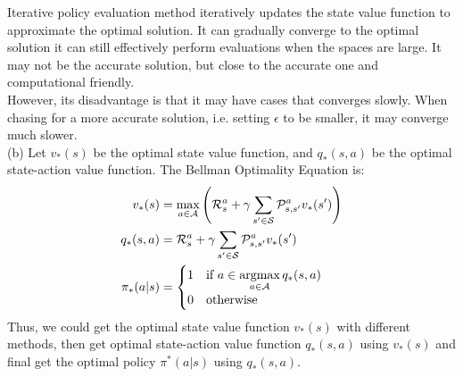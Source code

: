 \begin{homeworkProblem}
Iterative policy evaluation method iteratively updates the state value function to approximate the optimal solution. It can gradually converge to the optimal solution it can still effectively perform evaluations when the spaces are large. It may not be the accurate solution, but close to the accurate one and computational friendly. \\
However, its disadvantage is that it may have cases that converges slowly. When chasing for a more accurate solution, i.e. setting $\epsilon$ to be smaller, it may converge much slower. \\

(b) Let $v_*(s)$ be the optimal state value function, and $q_*(s,a)$ be the optimal state-action value function. The Bellman Optimality Equation is:
\begin{align*}
v_*(s) &= \max_{a \in \mathcal{A}}\left(\mathcal{R}_s^a + \gamma \sum_{s' \in \mathcal{S}} \mathcal{P}_{s,s'}^a v_*(s')\right) \\
q_*(s,a) &= \mathcal{R}_s^a + \gamma \sum_{s' \in \mathcal{S}} \mathcal{P}_{s,s'}^a v_*(s') \\
\pi_*(a|s) &= \begin{cases}
1 & \text{if } a\in \mathop{\rm argmax}\limits_{a\in\mathcal{A}}q_*(s,a) \\
0 & \text{otherwise}
\end{cases}
\end{align*}
Thus, we could get the optimal state value function $v_*(s)$ with different methods, then get optimal state-action value function $q_*(s,a)$ using $v_*(s)$ and final get the optimal policy $\pi^*(a|s)$ using $q_*(s,a)$.


\end{homeworkProblem}
